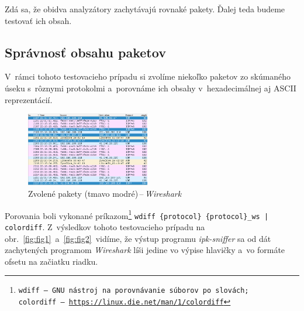 \documentclass[a4paper, 11pt, twocolumn]{article}
\begin{document}
        \begin{table}[h]
            \centering
            \caption{Porovnanie zachytených paketov}
        \end{table}
        
        Zdá sa, že obidva analyzátory zachytávajú rovnaké pakety. Ďalej teda budeme testovať ich obsah.
        
    \subsection{Správnosť obsahu paketov}
        V~rámci tohoto testovacieho prípadu si zvolíme niekoľko paketov zo skúmaného úseku s~rôznymi protokolmi a~porovnáme ich obsahy v~hexadecimálnej aj ASCII reprezentácií. \\
        
        \begin{figure}[ht]
            \centering
            \includegraphics[width=0.48\textwidth]{img/ws2.png}
            \caption{Zvolené pakety (tmavo modré)\,--\,\textit{Wireshark}}
        \end{figure}
        
        Porovania boli vykonané príkazom\texttt{\footnote{\texttt{wdiff}\,--\,GNU nástroj na porovnávanie súborov po slovách; \texttt{colordiff}\,--\,\href{https://linux.die.net/man/1/colordiff}{https://linux.die.net/man/1/colordiff}}} \texttt{wdiff \{protocol\} \{protocol\}\_ws | colordiff}. Z~výsledkov tohoto testovacieho prípadu na obr.~\ref{fig:fig1}~a~\ref{fig:fig2}~vidíme, že výstup programu \textit{ipk-sniffer} sa od dát zachytených programom \textit{Wireshark} líši jedine vo výpise hlavičky a~vo formáte ofsetu na začiatku riadku.
        
\end{document}
